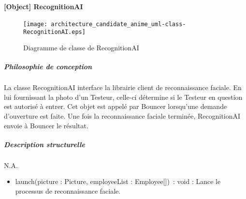     \paragraph{[Object] RecognitionAI}%
        \begin{figure} [H]
            \centering
            \texttt{[image: architecture\_candidate\_anime\_uml-class-RecognitionAI.eps]}
            \caption{Diagramme de classe de RecognitionAI}
            \label{Classe-RecognitionAI}
        \end{figure}
            \subparagraph{Philosophie de conception}%
            La classe RecognitionAI interface la librairie client de reconnaissance faciale.
            En lui fournissant la photo d’un Testeur, celle-ci détermine si le Testeur en question est autorisé à entrer.
            Cet objet est appelé par Bouncer lorsqu’une demande d’ouverture est faite.
            Une fois la reconnaissance faciale terminée, RecognitionAI envoie à Bouncer le résultat.
            \subparagraph{Description structurelle}%
                N.A.
                \begin{itemize}
                    \item{launch(picture : Picture, employeeList : Employee[]) : void : Lance le processus de reconnaissance faciale.}
                \end{itemize}
